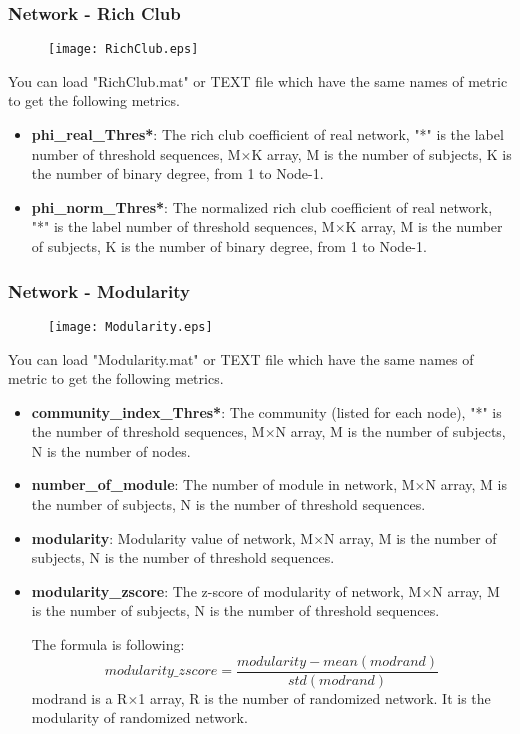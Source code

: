 \documentclass[11pt]{article}
\begin{document}
			\subsubsection{Network - Rich Club}
				\begin{figure}
					\begin{center}
						\texttt{[image: RichClub.eps]}
					\end{center}
				\end{figure}
				You can load "RichClub.mat" or TEXT file which have the same names of 
                metric to get the following metrics.
				\begin{itemize}
					\item \textbf{phi\_real\_Thres*}: The rich club coefficient of 
                        real network,
                        "*" is the label number of threshold sequences, 
                        M$\times$K array, M is the number of subjects, 
                        K is the number of binary degree, from 1 to Node-1.
					\item \textbf{phi\_norm\_Thres*}: The normalized rich club coefficient of 
                        real network,
                        "*" is the label number of threshold sequences, 
                        M$\times$K array, M is the number of subjects, 
                        K is the number of binary degree, from 1 to Node-1.
                \end{itemize}
			\subsubsection{Network - Modularity}
				\begin{figure}
					\begin{center}
						\texttt{[image: Modularity.eps]}
					\end{center}
				\end{figure}
				You can load "Modularity.mat" or TEXT file which have the same names of metric to get the following metrics.
				\begin{itemize}
					\item \textbf{community\_index\_Thres*}: The community (listed for each node), "*" is the number of threshold sequences,
						M$\times$N array, M is the number of subjects, N is the number of nodes.
					\item \textbf{number\_of\_module}: The number of module in network,
						M$\times$N array, M is the number of subjects, N is the number of threshold sequences.
					\item \textbf{modularity}: Modularity value of network,
						M$\times$N array, M is the number of subjects, N is the number of threshold sequences.
					\item \textbf{modularity\_zscore}: The z-score of modularity of network,
						M$\times$N array, M is the number of subjects, N is the number of threshold sequences.

						The formula is following:
						$$modularity\_zscore=\frac{modularity-mean(modrand)}{std(modrand)}$$
						modrand is a R$\times$1 array, R is the number of randomized network. 
						It is the modularity of randomized network.
				\end{itemize}
\end{document}
